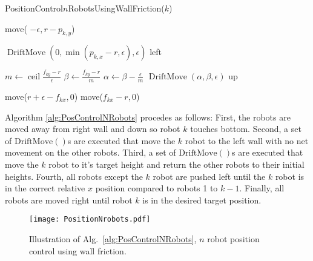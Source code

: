 \begin{algorithm}
\caption{PositionControl$n$RobotsUsingWallFriction($k$)}\label{alg:PosControlNRobots}
\begin{algorithmic}[1]
\State move( $-\epsilon, r-p_{k,y}$) %


\State $\operatorname{DriftMove}(0, \min(p_{k,x} - r,\epsilon), \epsilon)$ left   %
\EndWhile

\State $m \gets \operatorname{ceil}\frac{f_{ky}-r}{\epsilon}$
\State $\beta \gets \frac{f_{ky}-r}{m}$
\State $\alpha \gets \beta - \frac{\epsilon}{m}$
\State $\operatorname{DriftMove}(\alpha, \beta, \epsilon)$ up   %
\EndFor

\State move($r+\epsilon-f_{kx}, 0$)  %
\State move($f_{kx}-r, 0$)  

\end{algorithmic}
\end{algorithm}
Algorithm \ref{alg:PosControlNRobots} procedes as follows:  
First, the robots are moved  away from right wall and down so robot $k$ touches bottom.
Second, a set of $\operatorname{DriftMove()}$s are executed that  move the $k$ robot to the left wall with no net movement on the other robots.
Third, a set of $\operatorname{DriftMove()}$s are executed that  move the $k$ robot to it's target height and return the other robots to their initial heights. 
Fourth, all robots except the $k$ robot are pushed left until the $k$ robot is in the correct relative $x$ position compared to robots 1 to $k-1$.
Finally, all robots are moved right until robot $k$ is in the desired target position.
\begin{figure}
\begin{center}
	\texttt{[image: PositionNrobots.pdf]}
\end{center}
\caption{\label{fig:construction2d}
Illustration of Alg.\ \ref{alg:PosControlNRobots}, $n$ robot position control  using wall friction.
}
\end{figure}













